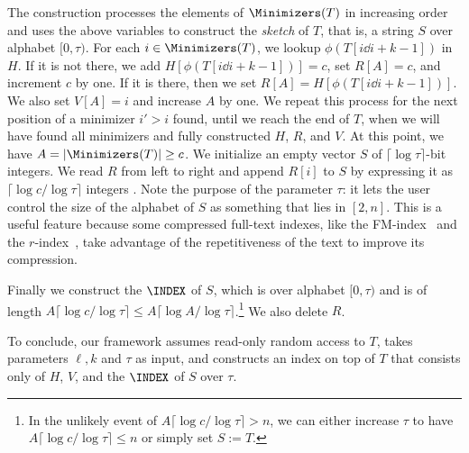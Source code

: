 
The construction processes the elements of $\Minimizers(T)$ in increasing order and uses the above variables to construct the \emph{sketch} of $T$, that is,
a string $S$ over alphabet $[0,\tau)$. For each $i \in \Minimizers(T)$,
we lookup $\phi(T[i\dd i+k-1])$ in $H$. If it is not there, we add $H[\phi(T[i\dd i+k-1])] = c$, set $R[A]=c$, and increment $c$ by one. If it is there, then we set $R[A] = H[\phi(T[i\dd i+k-1])]$.
We also set $V[A] = i$ and increase $A$ by one.
We repeat this process for the next position of a minimizer $i'> i$ found, until we reach the end of $T$, when we will have found all minimizers and fully constructed $H$, $R$, and $V$. At this point, we have $A=|\Minimizers(T)|\geq c$.
We initialize an empty vector $S$ of $\lceil \log \tau \rceil$-bit integers.
We read $R$ from left to right and append $R[i]$ to $S$ by expressing it as
$\lceil\log c/\log \tau\rceil$ integers .
Note the purpose of the parameter $\tau$: it lets the user control the size of the alphabet of $S$ as something that lies in $[2,n]$.
This is a useful feature because some compressed full-text indexes, like the FM-index~\cite{10.1145/1082036.1082039} and the $r$-index~\cite{10.1145/3375890}, take advantage of the repetitiveness of the text to improve its compression.

Finally we construct the $\INDEX$ of $S$, which is over alphabet $[0,\tau)$ and is of length $A\lceil\log c/\log \tau\rceil\leq A\lceil\log A/\log \tau\rceil$.\footnote{In the unlikely event of $A\lceil\log c/\log \tau\rceil > n$, we can either increase $\tau$ to have $A\lceil\log c/\log \tau\rceil \leq n$ or simply set $S:=T$.} We also delete $R$.

To conclude, our framework assumes read-only random access to $T$, takes parameters $\ell,k$ and $\tau$ as input, and constructs an index on top of $T$ that consists only of $H$, $V$, and the $\INDEX$ of $S$ over $\tau$.

